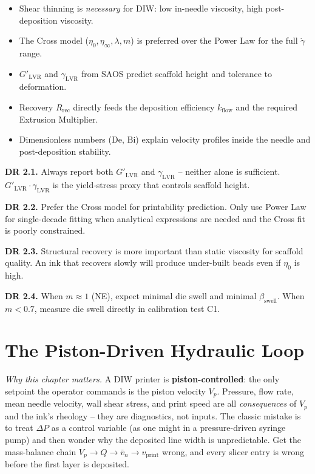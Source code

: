 \documentclass[11pt,a4paper]{article}
\newcommand{\gd}{\dot{\gamma}}
\newcommand{\Bi}{\mathrm{Bi}}
\newcommand{\De}{\mathrm{De}}
\begin{document}
\begin{takeawaybox}
\begin{itemize}[leftmargin=1.4em,itemsep=2pt]
\item Shear thinning is \emph{necessary} for DIW: low in-needle viscosity,
  high post-deposition viscosity.
\item The Cross model ($\eta_0, \eta_\infty, \lambda, m$) is preferred
  over the Power Law for the full $\gd$ range.
\item $G'_\mathrm{LVR}$ and $\gamma_\mathrm{LVR}$ from SAOS predict
  scaffold height and tolerance to deformation.
\item Recovery $R_\mathrm{rec}$ directly feeds the deposition efficiency
  $k_\mathrm{flow}$ and the required Extrusion Multiplier.
\item Dimensionless numbers ($\De$, $\Bi$) explain velocity profiles
  inside the needle and post-deposition stability.
\end{itemize}
\end{takeawaybox}

\begin{designrulebox}
\textbf{DR 2.1.} Always report both $G'_\mathrm{LVR}$ and
$\gamma_\mathrm{LVR}$ -- neither alone is sufficient.
$G'_\mathrm{LVR}\cdot\gamma_\mathrm{LVR}$ is the yield-stress proxy
that controls scaffold height.

\textbf{DR 2.2.} Prefer the Cross model for printability prediction.
Only use Power Law for single-decade fitting when analytical expressions
are needed and the Cross fit is poorly constrained.

\textbf{DR 2.3.} Structural recovery is more important than static
viscosity for scaffold quality. An ink that recovers slowly will
produce under-built beads even if $\eta_0$ is high.

\textbf{DR 2.4.} When $m\approx 1$ (NE), expect minimal die swell
and minimal $\beta_\mathrm{swell}$. When $m<0.7$, measure die swell
directly in calibration test C1.
\end{designrulebox}

\section{The Piston-Driven Hydraulic Loop}
\label{sec:hydraulic_loop}

\emph{Why this chapter matters.}
A DIW printer is \textbf{piston-controlled}: the only setpoint the operator
commands is the piston velocity $V_p$. Pressure, flow rate, mean needle
velocity, wall shear stress, and print speed are all \emph{consequences}
of $V_p$ and the ink's rheology -- they are diagnostics, not inputs. The
classic mistake is to treat $\Delta P$ as a control variable (as one might
in a pressure-driven syringe pump) and then wonder why the deposited line
width is unpredictable. Get the mass-balance chain $V_p \to Q \to \bar v_n
\to v_\mathrm{print}$ wrong, and every slicer entry is wrong before the
first layer is deposited.
\end{document}
